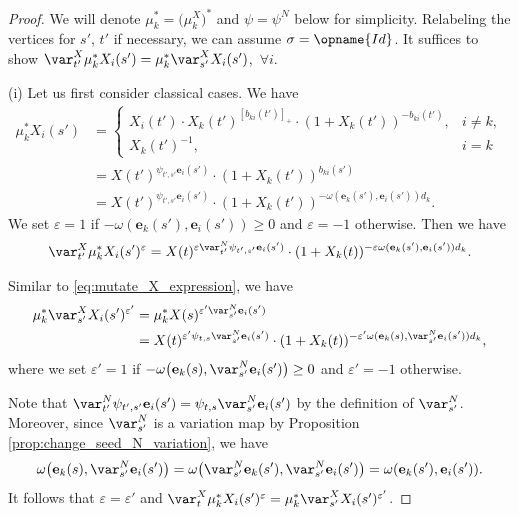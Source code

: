 \documentclass[pdftex]{sigma}
\newcommand{\Id}{{\opname{Id}}}
\newcommand{\ee}{\mathbf{e}}
\numberwithin{equation}{section}
\begin{document}
\begin{proof}
 We will denote $\mu_{k}^{*}=\big(\mu_{k}^{X}\big)^{*}$ and $\psi=\psi^N$ below for simplicity. Relabeling the vertices for $s'$, $t'$ if necessary, we can
assume $\sigma=\Id$. It suffices to show $\var_{t'}^{X}\mu_{k}^{*}X_{i}(s')=\mu_{k}^{*}\var_{s'}^{X}X_{i}(s')$,~$\forall i$.

(i) Let us first consider classical cases. We have
\begin{align}
\mu_{k}^{*}X_{i}(s') & =\begin{cases}
X_{i}(t')\cdot X_{k}(t')^{[b_{ki}(t')]_{+}}\cdot(1+X_{k}(t'))^{-b_{ki}(t')}, & i\neq k,\\
X_{k}(t')^{-1}, & i=k
\end{cases} \nonumber\\
 & =X(t')^{\psi_{t',s'}\ee_{i}(s')}\cdot(1+X_{k}(t'))^{b_{ki}(s')}\nonumber \\
 & =X(t')^{\psi_{t',s'}\ee_{i}(s')}\cdot(1+X_{k}(t'))^{-\omega(\ee_{k}(s'),\ee_{i}(s'))d_{k}}. \label{eq:mutate_X_expression}
\end{align}
We set $\varepsilon=1$ if $-\omega(\ee_{k}(s'),\ee_{i}(s'))\geq 0$ and $\varepsilon=-1$ otherwise. Then we have
\begin{align}\label{eq:var_mu_X}
 \var_{t'}^{X}\mu_{k}^{*}X_{i}(s')^\varepsilon=X(t)^{\varepsilon\var_{t'}^{N}\psi_{t',s'}\ee_{i}(s')}\cdot(1+X_{k}(t))^{-\varepsilon\omega(\ee_{k}(s'),\ee_{i}(s'))d_{k}}.
\end{align}

Similar to \eqref{eq:mutate_X_expression}, we have
\begin{align}\label{eq:mu_var_X}
\mu_{k}^{*}\var_{s'}^{X}X_{i}(s')^{{\varepsilon'}} & =\mu_{k}^{*}X(s)^{{\varepsilon'}\var_{s'}^{N}\ee_{i}(s')} \nonumber\\
 & =X(t)^{{\varepsilon'}\psi_{t,s}\var_{s'}^{N}\ee_{i}(s')}\cdot (1+X_{k}(t))^{-{\varepsilon'}\omega(\ee_{k}(s),\var_{s'}^{N}\ee_{i}(s'))d_{k}},
\end{align}
where we set $\varepsilon'=1$ if $-\omega\big(\ee_{k}(s),\var_{s'}^{N}\ee_{i}(s')\big)\geq 0$ and $\varepsilon'=-1$ otherwise.

Note that $\var_{t'}^{N}\psi_{t',s'}\ee_{i}(s')=\psi_{t,s}\var_{s'}^{N}\ee_{i}(s')$
by the definition of $\var_{s'}^{N}$. Moreover, since $\var_{s'}^{N}$
is a variation map by Proposition \ref{prop:change_seed_N_variation},
we have \[\omega\big(\ee_{k}(s),\var_{s'}^{N}\ee_{i}(s')\big)=\omega\bigl(\var_{s'}^{N}\ee_{k}(s'),\var_{s'}^{N}\ee_{i}(s')\bigr)=\omega(\ee_{k}(s'),\ee_{i}(s')).\]
It follows that $\varepsilon=\varepsilon'$ and $\var_{t}^{X}\mu_{k}^{*}X_{i}(s')^{\varepsilon}=\mu_{k}^{*}\var_{s'}^{X}X_{i}(s')^{{\varepsilon'}}$.


\end{proof}
\end{document}
